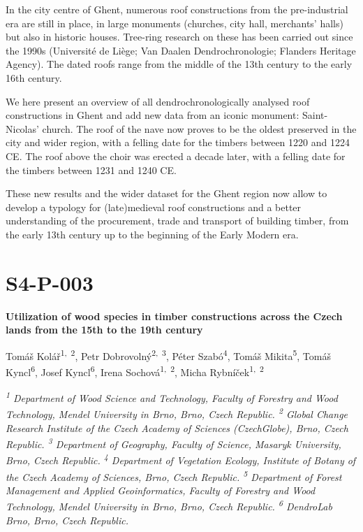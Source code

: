 \documentclass[
]{book}
\begin{document}
In the city centre of Ghent, numerous roof constructions from the pre-industrial era are still in place, in large monuments (churches, city hall, merchants' halls) but also in historic houses. Tree-ring research on these has been carried out since the 1990s (Université de Liège; Van Daalen Dendrochronologie; Flanders Heritage Agency). The dated roofs range from the middle of the 13th century to the early 16th century.

We here present an overview of all dendrochronologically analysed roof constructions in Ghent and add new data from an iconic monument: Saint-Nicolas' church. The roof of the nave now proves to be the oldest preserved in the city and wider region, with a felling date for the timbers between 1220 and 1224 CE. The roof above the choir was erected a decade later, with a felling date for the timbers between 1231 and 1240 CE.

These new results and the wider dataset for the Ghent region now allow to develop a typology for (late)medieval roof constructions and a better understanding of the procurement, trade and transport of building timber, from the early 13th century up to the beginning of the Early Modern era.

\hypertarget{s4-p-003}{%
\section*{S4-P-003}\label{s4-p-003}}

\textbf{Utilization of wood species in timber constructions across the Czech lands from the 15th to the 19th century}

Tomáš Kolář\textsuperscript{1,~2}, Petr Dobrovolný\textsuperscript{2,~3}, Péter Szabó\textsuperscript{4}, Tomáš Mikita\textsuperscript{5}, Tomáš Kyncl\textsuperscript{6}, Josef Kyncl\textsuperscript{6}, Irena Sochová\textsuperscript{1,~2}, Micha Rybníček\textsuperscript{1,~2}

\emph{\textsuperscript{1} Department of Wood Science and Technology, Faculty of Forestry and Wood Technology, Mendel University in Brno, Brno, Czech Republic. \textsuperscript{2} Global Change Research Institute of the Czech Academy of Sciences (CzechGlobe), Brno, Czech Republic. \textsuperscript{3} Department of Geography, Faculty of Science, Masaryk University, Brno, Czech Republic. \textsuperscript{4} Department of Vegetation Ecology, Institute of Botany of the Czech Academy of Sciences, Brno, Czech Republic. \textsuperscript{5} Department of Forest Management and Applied Geoinformatics, Faculty of Forestry and Wood Technology, Mendel University in Brno, Brno, Czech Republic. \textsuperscript{6} DendroLab Brno, Brno, Czech Republic.}
\end{document}
